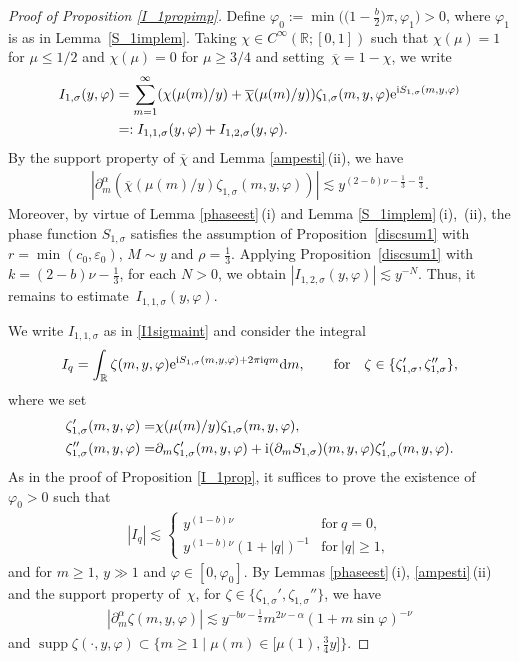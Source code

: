 \documentclass[pdftex]{sigma}
\numberwithin{equation}{section}
\def\R{\mathbb{R}}%
\DeclareMathOperator{\supp}{supp}%
\def\a{\alpha}
\def\e{\varepsilon}
\def\f{\varphi}
\def\m{\mu}
\def\n{\nu}
\def\s{\sigma}
\def\z{\zeta}
\def\pa{\partial}
\begin{document}
\begin{proof}[Proof of Proposition \ref{I_1propimp}]
Define $\f_0:=\min\bigl(\bigl(1-\frac{b}{2}\bigr)\pi,\f_1\bigr)>0$, where $\f_1$ is as in Lemma~\ref{S_1implem}.
Taking $\chi\in C^{\infty}(\R;[0,1])$ such that $\chi(\m)=1$ for $\m\leq 1/2$ and $\chi(\m)=0$ for $\m\geq 3/4$ and setting~${\overline{\chi}=1-\chi}$, we write
\begin{align*}
I_{1,\s}(y,\f)&= \sum_{m=1}^{\infty}(\chi(\m(m)/y)+\overline{\chi}(\m(m)/y)) \z_{1,\s}(m,y,\f){\rm e}^{{\rm i}S_{1,\s}(m,y,\f)} \\
&=: I_{1,1,\s}(y,\f)+I_{1,2,\s}(y,\f).
\end{align*}
By the support property of $\overline{\chi}$ and Lemma \ref{ampesti}\,(ii), we have
\begin{align*}
|\pa_{m}^{\a}(\overline{\chi}(\m(m)/y)\z_{1,\s}(m,y,\f))|\lesssim y^{(2-b)\n-\frac{1}{3}-\frac{\a}{3}}.
\end{align*}
Moreover, by virtue of Lemma \ref{phaseest}\,(i) and Lemma \ref{S_1implem}\,(i),~(ii), the phase function $S_{1,\s}$ satisfies the assumption of Proposition~\ref{discsum1} with $r=\min(c_0,\e_0)$, $M\sim y$ and $\rho=\frac{1}{3}$. Applying Proposition~\ref{discsum1} with $k=(2-b)\n-\frac{1}{3}$, for each $N>0$, we obtain $|I_{1,2,\s}(y,\f)|\lesssim y^{-N}$. Thus, it remains to estimate~${I_{1,1,\s}(y,\f)}$.

We write $I_{1,1,\s}$ as in \eqref{I1sigmaint} and consider the integral
\begin{align*}
I_{q}=\int_{\R}\z(m,y,\f){\rm e}^{{\rm i}S_{1,\s}(m,y,\f)+2\pi {\rm i}qm}{\rm d}m, \qquad \text{for}\quad \z\in \{\z_{1,\s}',\z_{1,\s}''\},
\end{align*}
where we set
\begin{align*}
\z'_{1,\s}(m,y,\f)=&\chi(\m(m)/y)\z_{1,\s}(m,y,\f),\\
\z''_{1,\s}(m,y,\f)=&\pa_m\z_{1,\s}'(m,y,\f)+{\rm i}(\pa_mS_{1,\s})(m,y,\f)\z_{1,\s}'(m,y,\f).
\end{align*}
As in the proof of Proposition \ref{I_1prop}, it suffices to prove the existence of $\f_0>0$ such that
\begin{align}\label{I_qest2}
|I_q|\lesssim \begin{cases}
y^{(1-b)\n}& \text{for}\  q=0,\\
y^{(1-b)\n}(1+|q|)^{-1}& \text{for}\  |q|\geq 1,
\end{cases}
\end{align}
and for $m\geq 1$, $y\gg 1$ and $\f\in [0,\f_0]$.
By Lemmas \ref{phaseest}\,(i), \ref{ampesti}\,(ii) and the support property of~$\chi$, for $\z\in\{\z_{1,\s}',\z_{1,\s}''\}$, we have
\begin{align}\label{zetapart2symbolest}
|\pa_m^{\a}\z(m,y,\f)|\lesssim y^{-b\n-\frac{1}{2}}m^{2\n-\a}(1+m\sin \f)^{-\n}
\end{align}
and $\supp \z(\cdot,y,\f)\subset \big\{m\geq 1\mid \m(m)\in \bigl[\m(1),\frac{3}{4}y\bigr]\big\}$.


\end{proof}
\end{document}
